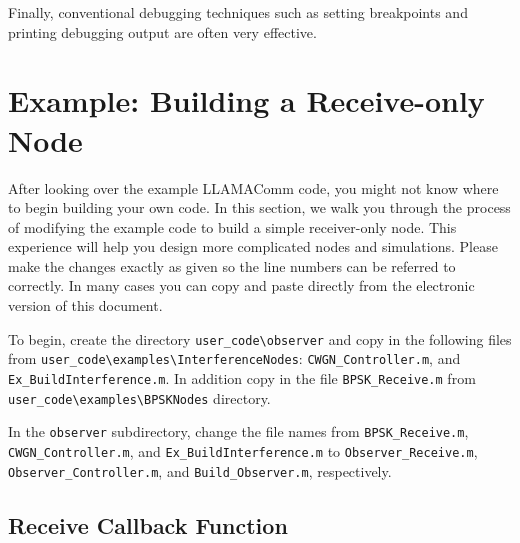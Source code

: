 Finally, conventional debugging techniques such as setting breakpoints and
printing debugging output are often very effective.

\section{Example: Building a Receive-only Node}
\label{sec:adding_observer}
After looking over the example LLAMAComm code, you might not know where to begin building your own code.  In this section, we walk you through the process of modifying the example code to build a simple receiver-only node.  This experience will help you design more complicated nodes and simulations.  Please make the changes exactly as given so the line numbers can be referred to correctly.  In many cases you can copy and paste directly from the electronic version of this document.

To begin, create the directory \verb+user_code\observer+ and copy in the following files from
\verb+user_code\examples\InterferenceNodes+: \verb+CWGN_Controller.m+, and \verb+Ex_BuildInterference.m+.
In addition copy in the file \verb+BPSK_Receive.m+ from \verb+user_code\examples\BPSKNodes+ directory.

In the \verb+observer+ subdirectory,
change the file names from \verb+BPSK_Receive.m+, \verb+CWGN_Controller.m+, and \verb+Ex_BuildInterference.m+ to \verb+Observer_Receive.m+, \verb+Observer_Controller.m+, and \verb+Build_Observer.m+, respectively.

\subsection{Receive Callback Function}
\label{sec:observer_rec}

